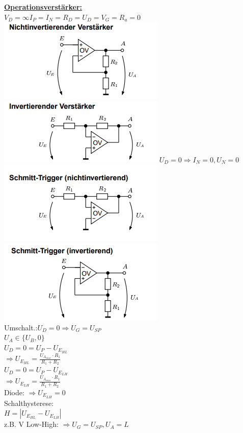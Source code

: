 \documentclass[8pt]{extarticle}
\begin{document}
\begin{minipage}{0.33\textwidth}
\underline{\textbf{Operationsverstärker:}}\\
$V_D = \infty I_P=I_N=R_D=U_D=V_G=R_a=0$\\
\includegraphics[scale=0.40]{NIOV.png}
\includegraphics[scale=0.40]{IOV.png}
$U_D = 0 \Rightarrow I_N = 0, U_N = 0$\\

\includegraphics[scale=0.40]{NISTOV.png}\\
\includegraphics[scale=0.40]{ISTOV.png}\\
Umschalt.:$U_D = 0 \Rightarrow U_G = U_{SP}$\\
$U_A \in \{U_B,0\}$\\
$U_D = 0 = U_P - U_{E_{HL}}$\\
\phantom{sssi}$\Rightarrow U_{E_{HL}} = \frac{U_{A_{max}} \cdot R_1}{R_1 + R_2}$\\
$U_D = 0 = U_P - U_{E_{LH}}$\\
\phantom{sssi}$\Rightarrow U_{E_{LH}}= \frac{ U_{A_{min}} \cdot R_1}{R_1 + R_2}$\\
Diode: $\Rightarrow U_{E_{LH}} = 0$\\
Schalthysterese:\\
\phantom{sssssi} $H = |U_{E_{HL}} - U_{E_{LH}}|$\\
z.B. V Low-High: $\Rightarrow U_G = U_{SP}, U_A=L$


\end{minipage}
\end{document}
